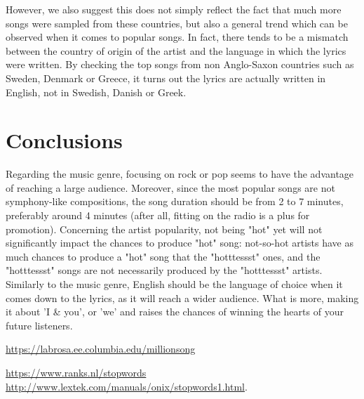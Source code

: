 \documentclass[11pt]{article}
\renewcommand\_{\textunderscore\allowbreak}
\begin{document}
However, we also suggest this does not simply reflect the fact that much more songs were sampled from these countries, but also a general trend which can be observed when it comes to popular songs.
In fact, there tends to be a mismatch between the country of origin of the artist and the language in which the lyrics were written.
By checking the top songs from non Anglo-Saxon countries such as Sweden, Denmark or Greece, it turns out the lyrics are actually written in English, not in Swedish, Danish or Greek.


	
\section{Conclusions}


Regarding the music genre, focusing on rock or pop seems to have the advantage of reaching a large audience.
Moreover, since the most popular songs are not symphony-like compositions, the song duration should be from 2 to 7 minutes, preferably around 4 minutes (after all, fitting on the radio is a plus for promotion).
Concerning the artist popularity, not being "hot" yet will not significantly impact the chances to produce "hot" song: not-so-hot artists have as much chances to produce a "hot" song that the "hotttessst" ones, and the "hotttessst" songs are not necessarily produced by the "hotttessst" artists.
Similarly to the music genre, English should be the language of choice when it comes down to the lyrics, as it will reach a wider audience. What is more, making it about 'I \& you', or 'we' and raises the chances of winning the hearts of your future listeners.


\begin{thebibliography}{}

\url{https://labrosa.ee.columbia.edu/millionsong}

\url{https://www.ranks.nl/stopwords}\\
\url{http://www.lextek.com/manuals/onix/stopwords1.html}.


\end{thebibliography}
\end{document}
